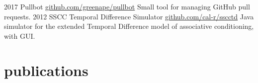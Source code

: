 \documentclass[]{friggeri-cv}
\begin{document}
\begin{entrylist}
  \entry
    {2017}
    {Pullbot}
    {\href{https://github.com/greenape/pullbot}{github.com/greenape/pullbot}}
    {Small tool for managing GitHub pull requests.}
  \entry
    {2012}
    {SSCC Temporal Difference Simulator}
    {\href{https://github.com/cal-r/sscctd}{github.com/cal-r/sscctd}}
    {Java simulator for the extended Temporal Difference model of associative conditioning, with GUI.}
\end{entrylist}

\section{publications}

\printbibliography
\end{document}
